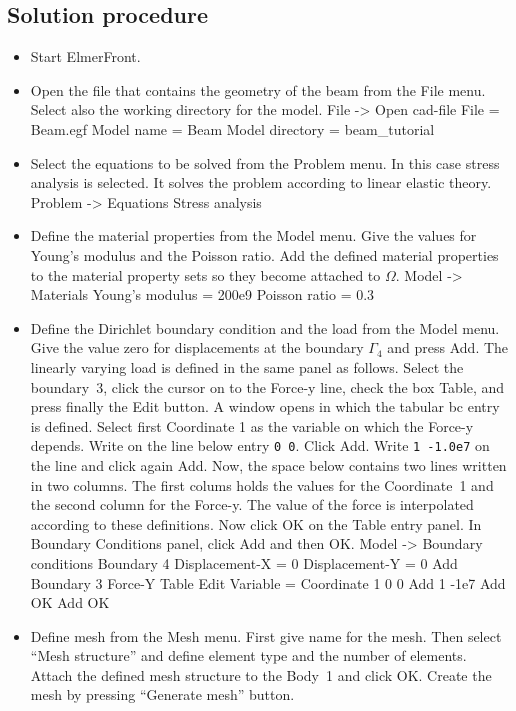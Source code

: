 \subsection*{Solution procedure}

\begin{itemize}
\item Start ElmerFront.
\item Open the file that contains the geometry of the beam from 
the File menu. Select also the working directory for the model.
\ttbegin
File -> Open cad-file 
  File = Beam.egf 
  Model name = Beam 
  Model directory = beam_tutorial
\ttend
\item Select the equations to be solved from the Problem menu. In this 
case stress analysis is selected. It solves the problem according to 
linear elastic theory. 
\ttbegin
Problem -> Equations 
  Stress analysis 
\ttend
\item Define the material properties from the Model menu. Give the values for 
Young's modulus and the Poisson ratio. Add the defined material 
properties to the material property sets so they become attached 
to $\Omega$. 
\ttbegin
Model -> Materials 
  Young's modulus = 200e9 
  Poisson ratio = 0.3
\ttend

\item Define the Dirichlet boundary condition and the load from the
Model menu. Give the value zero for displacements at the boundary
$\Gamma_4$ and press Add. The linearly varying load is defined in the
same panel as follows.  Select the boundary~3, click the cursor on to
the Force-y line, check the box Table, and press finally the Edit
button. A window opens in which the tabular bc entry is
defined. Select first Coordinate 1 as the variable on which the
Force-y depends. Write on the line below entry {\tt 0 0}. Click
Add. Write {\tt 1 -1.0e7} on the line and click again Add. Now, the
space below contains two lines written in two columns. The first
colums holds the values for the Coordinate~1 and the second column for
the Force-y. The value of the force is interpolated according to these
definitions. Now click OK on the Table entry panel. In Boundary
Conditions panel, click Add and then OK.
\ttbegin
Model -> Boundary conditions
Boundary 4
Displacement-X = 0
Displacement-Y = 0
Add
Boundary 3
Force-Y
Table
Edit
Variable = Coordinate 1
0 0
Add
1 -1e7
Add
OK
Add
OK
\ttend

\item Define mesh from the Mesh menu. First give name for the
mesh. Then select ``Mesh structure'' and define element type and the
number of elements. Attach the defined mesh structure to the Body~1
and click OK. Create the mesh by pressing ``Generate mesh'' button.


\end{itemize}
